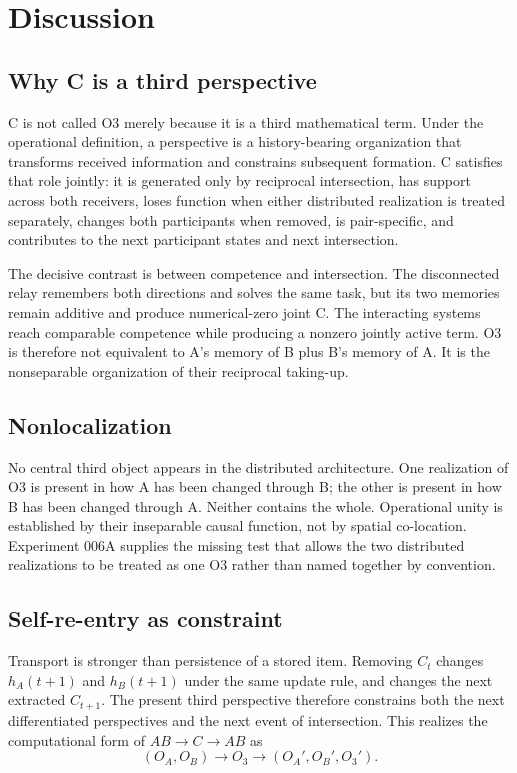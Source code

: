 \documentclass[11pt,a4paper]{article}
\newcommand{\OA}{\ensuremath{O_{A}}}
\newcommand{\OB}{\ensuremath{O_{B}}}
\newcommand{\Othree}{\ensuremath{O_{3}}}
\begin{document}
\section{Discussion}

\subsection{Why C is a third perspective}

C is not called O3 merely because it is a third mathematical term. Under the operational definition, a perspective is a history-bearing organization that transforms received information and constrains subsequent formation. C satisfies that role jointly: it is generated only by reciprocal intersection, has support across both receivers, loses function when either distributed realization is treated separately, changes both participants when removed, is pair-specific, and contributes to the next participant states and next intersection.

The decisive contrast is between competence and intersection. The disconnected relay remembers both directions and solves the same task, but its two memories remain additive and produce numerical-zero joint C. The interacting systems reach comparable competence while producing a nonzero jointly active term. O3 is therefore not equivalent to A's memory of B plus B's memory of A. It is the nonseparable organization of their reciprocal taking-up.

\subsection{Nonlocalization}

No central third object appears in the distributed architecture. One realization of O3 is present in how A has been changed through B; the other is present in how B has been changed through A. Neither contains the whole. Operational unity is established by their inseparable causal function, not by spatial co-location. Experiment 006A supplies the missing test that allows the two distributed realizations to be treated as one O3 rather than named together by convention.

\subsection{Self-re-entry as constraint}

Transport is stronger than persistence of a stored item. Removing $C_t$ changes $h_A(t+1)$ and $h_B(t+1)$ under the same update rule, and changes the next extracted $C_{t+1}$. The present third perspective therefore constrains both the next differentiated perspectives and the next event of intersection. This realizes the computational form of $AB\rightarrow C\rightarrow AB$ as
\[
 (\OA,\OB)\rightarrow\Othree
 \rightarrow(\OA',\OB',\Othree').
\]
\end{document}
